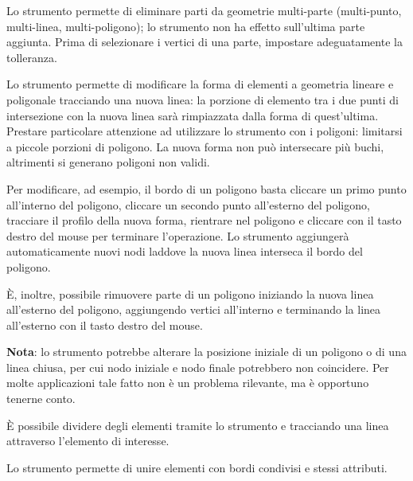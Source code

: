 
Lo strumento  permette di eliminare parti 
da geometrie multi-parte (multi-punto, multi-linea, multi-poligono); lo strumento non 
ha effetto sull'ultima parte aggiunta. Prima di selezionare i vertici di una parte, 
impostare adeguatamente la tolleranza.


Lo strumento  permette di modificare la 
forma di elementi a geometria lineare e poligonale tracciando una nuova linea: la porzione 
di elemento tra i due punti di intersezione con la nuova linea sarà rimpiazzata dalla 
forma di quest'ultima. Prestare particolare attenzione ad utilizzare lo strumento con 
i poligoni: limitarsi a piccole porzioni di poligono. La nuova forma non può intersecare 
più buchi, altrimenti si generano poligoni non validi. 

Per modificare, ad esempio, il bordo di un poligono basta cliccare un primo punto all'interno 
del poligono, cliccare un secondo punto all'esterno del poligono, tracciare il profilo 
della nuova forma, rientrare nel poligono e cliccare con il tasto destro del mouse per terminare 
l'operazione. Lo strumento aggiungerà automaticamente nuovi nodi laddove la nuova linea 
interseca il bordo del poligono.

È, inoltre, possibile rimuovere parte di un poligono iniziando la nuova linea all'esterno del 
poligono, aggiungendo vertici all'interno e terminando la linea all'esterno con il 
tasto destro del mouse.

\textbf{Nota}: lo strumento potrebbe alterare la posizione iniziale di un poligono o di una
linea chiusa, per cui nodo iniziale e nodo finale potrebbero non coincidere. Per molte applicazioni
tale fatto non è un problema rilevante, ma è opportuno tenerne conto.


È possibile dividere degli elementi tramite lo strumento  e tracciando una linea attraverso l'elemento di interesse. 


Lo strumento  permette 
di unire elementi con bordi condivisi e stessi attributi.

